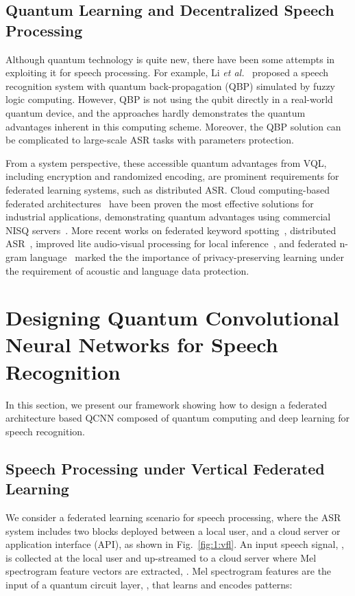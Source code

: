 \documentclass{article}
\begin{document}
\subsection{Quantum Learning and Decentralized Speech Processing}
Although quantum technology is quite new, there have been some attempts in exploiting it for speech processing. For example,  Li \emph{et al.}~\cite{li2002quantum} proposed a speech recognition system with quantum back-propagation (QBP) simulated by fuzzy logic computing. However, QBP is not using the qubit directly in a real-world quantum device, and the approaches hardly demonstrates the quantum advantages inherent in this computing scheme. Moreover, the QBP solution can be complicated to large-scale ASR tasks with parameters protection. 

From a system perspective, these accessible quantum advantages from VQL, including encryption and randomized encoding, are prominent requirements for federated learning systems, such as distributed ASR. Cloud computing-based federated architectures~\cite{yang2019federated} have been proven the most effective solutions for industrial applications, demonstrating quantum advantages using commercial NISQ servers~\cite{ mohseni2017commercialize}.  More recent works on federated keyword spotting~\cite{leroy2019federated}, distributed ASR~\cite{qi2020submodular}, improved lite audio-visual processing for local inference~\cite{chuang2020improved}, and federated n-gram language~\cite{chen2019federated} marked the the importance of privacy-preserving learning under the requirement of acoustic and language data protection. 





\section{Designing Quantum Convolutional Neural Networks for Speech Recognition}
\label{sec:proposal}
In this section, we present our framework showing how to design a federated architecture based QCNN composed of quantum computing and deep learning for speech recognition.

\subsection{Speech Processing under Vertical Federated Learning}
We consider a federated learning scenario for speech processing, where the ASR system includes two blocks deployed between a local user, and a cloud server or application interface (API), as shown in Fig.~\ref{fig:1:vfl}. An input speech signal, , is collected at the local user and up-streamed to a cloud server where Mel spectrogram feature vectors are extracted, . Mel spectrogram features are the input of a quantum circuit layer, , that learns and encodes patterns:
\end{document}
